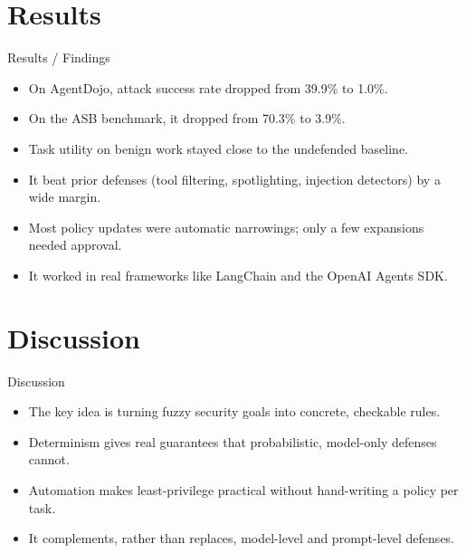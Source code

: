 \documentclass[10pt]{beamer}
\begin{document}
\section{Results}
\begin{frame}[allowframebreaks]{Results / Findings}
\begin{itemize}
  \item On AgentDojo, attack success rate dropped from 39.9\% to 1.0\%.
  \item On the ASB benchmark, it dropped from 70.3\% to 3.9\%.
  \item Task utility on benign work stayed close to the undefended baseline.
  \item It beat prior defenses (tool filtering, spotlighting, injection detectors) by a wide margin.
  \item Most policy updates were automatic narrowings; only a few expansions needed approval.
  \item It worked in real frameworks like LangChain and the OpenAI Agents SDK.
\end{itemize}
\end{frame}
\section{Discussion}
\begin{frame}{Discussion}
\begin{itemize}
  \item The key idea is turning fuzzy security goals into concrete, checkable rules.
  \item Determinism gives real guarantees that probabilistic, model-only defenses cannot.
  \item Automation makes least-privilege practical without hand-writing a policy per task.
  \item It complements, rather than replaces, model-level and prompt-level defenses.
\end{itemize}
\end{frame}
\end{document}

